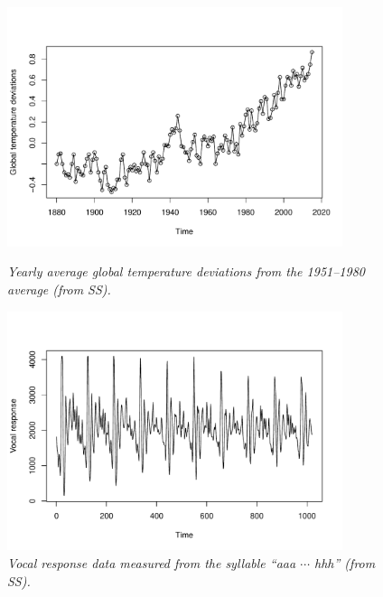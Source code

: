 \documentclass{article}
\begin{document}
\begin{figure}[p]
\centering
\includegraphics[width=0.875\textwidth]{fig/gw-1.pdf}
\caption{\it Yearly average global temperature deviations from the 1951--1980
  average (from SS).}
\label{fig:gw}

\includegraphics[width=0.875\textwidth]{fig/speech-1.pdf}
\caption{\it Vocal response data measured from the syllable ``aaa $\cdots$
  hhh'' (from SS).} 
\label{fig:speech}
\end{figure}
\end{document}
